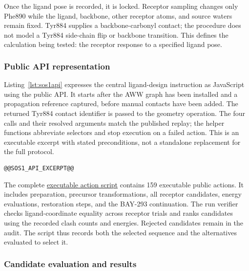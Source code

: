 Once the ligand pose is recorded, it is locked. Receptor sampling changes only Phe890 while the ligand, backbone, other receptor atoms, and source waters remain fixed. Tyr884 supplies a backbone-carbonyl contact; the procedure does not model a Tyr884 side-chain flip or backbone transition. This defines the calculation being tested: the receptor response to a specified ligand pose.

\subsubsection{Public API representation}

Listing~\ref{lst:sos1api} expresses the central ligand-design instruction as JavaScript using the public API. It starts after the AWW graph has been installed and a propagation reference captured, before manual contacts have been added. The returned Tyr884 contact identifier is passed to the geometry operation. The four calls and their resolved arguments match the published replay; the helper functions abbreviate selectors and stop execution on a failed action. This is an executable excerpt with stated preconditions, not a standalone replacement for the full protocol.

\noindent\begin{minipage}{\linewidth}
\begin{lstlisting}[language={},caption={Public API code for the AWW ligand hypothesis and coordinate lock.},label={lst:sos1api}]
@@SOS1_API_EXCERPT@@
\end{lstlisting}
\end{minipage}\par\medskip

The complete \href{https://molarium.org/design-history/publications/sos1/designer-intent-2026-09-04/executable.action-script.json}{executable action script} contains 159 executable public actions. It includes preparation, precursor transformations, all receptor candidates, energy evaluations, restoration steps, and the BAY-293 continuation. The run verifier checks ligand-coordinate equality across receptor trials and ranks candidates using the recorded clash counts and energies. Rejected candidates remain in the audit. The script thus records both the selected sequence and the alternatives evaluated to select it.

\subsubsection{Candidate evaluation and results}

